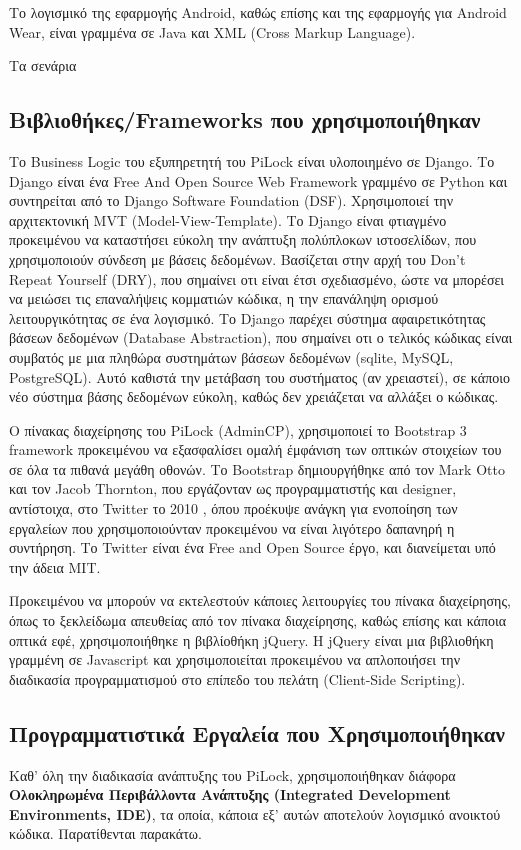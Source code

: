 		Το λογισμικό της εφαρμογής Android, καθώς επίσης και της εφαρμογής για Android Wear, είναι γραμμένα σε Java και XML (Cross Markup Language).

		Τα σενάρια 

	\subsection{Βιβλιοθήκες/Frameworks που χρησιμοποιήθηκαν}
		\label{sub:fws}
		Το Business Logic του εξυπηρετητή του PiLock είναι υλοποιημένο σε Django. Το Django είναι ένα Free And Open Source Web Framework γραμμένο σε Python και συντηρείται από το Django Software Foundation (DSF). Χρησιμοποιεί την αρχιτεκτονική MVT (Model-View-Template). Το Django είναι φτιαγμένο προκειμένου να καταστήσει εύκολη την ανάπτυξη πολύπλοκων ιστοσελίδων, που χρησιμοποιούν σύνδεση με βάσεις δεδομένων. Βασίζεται στην αρχή του Don't Repeat Yourself (DRY), που σημαίνει οτι είναι έτσι σχεδιασμένο, ώστε να μπορέσει να μειώσει τις επαναλήψεις κομματιών κώδικα, η την επανάληψη ορισμού λειτουργικότητας σε ένα λογισμικό. Το Django παρέχει σύστημα αφαιρετικότητας βάσεων δεδομένων (Database Abstraction), που σημαίνει οτι ο τελικός κώδικας είναι συμβατός με μια πληθώρα συστημάτων βάσεων δεδομένων (sqlite, MySQL, PostgreSQL). Αυτό καθιστά την μετάβαση του συστήματος (αν χρειαστεί), σε κάποιο νέο σύστημα βάσης δεδομένων εύκολη, καθώς δεν χρειάζεται να αλλάξει ο κώδικας.

		Ο πίνακας διαχείρησης του PiLock (AdminCP), χρησιμοποιεί το Bootstrap 3 framework προκειμένου να εξασφαλίσει ομαλή έμφάνιση των οπτικών στοιχείων του σε όλα τα πιθανά μεγάθη οθονών. Το Bootstrap δημιουργήθηκε από τον Mark Otto και τον Jacob Thornton, που εργάζονταν ως προγραμματιστής και designer, αντίστοιχα, στο Twitter το 2010 \textsuperscript{\cite{BS_about}}, όπου προέκυψε ανάγκη για ενοποίηση των εργαλείων που χρησιμοποιούνταν προκειμένου να είναι λιγότερο δαπανηρή η συντήρηση. Το Twitter είναι ένα Free and Open Source έργο, και διανείμεται υπό την άδεια MIT.
 		
 		Προκειμένου να μπορούν να εκτελεστούν κάποιες λειτουργίες του πίνακα διαχείρησης, όπως το ξεκλείδωμα απευθείας από τον πίνακα διαχείρησης, καθώς επίσης και κάποια οπτικά εφέ, χρησιμοποιήθηκε η βιβλίοθήκη jQuery. H jQuery είναι μια βιβλιοθήκη γραμμένη σε Javascript και χρησιμοποιείται προκειμένου να απλοποιήσει την διαδικασία προγραμματισμού στο επίπεδο του πελάτη (Client-Side Scripting).

 	\subsection{Προγραμματιστικά Εργαλεία που Χρησιμοποιήθηκαν}
 		Καθ' όλη την διαδικασία ανάπτυξης του PiLock, χρησιμοποιήθηκαν διάφορα \textbf{Ολοκληρωμένα Περιβάλλοντα Ανάπτυξης (Integrated Development Environments, IDE)}, τα οποία, κάποια εξ' αυτών αποτελούν λογισμικό ανοικτού κώδικα. Παρατίθενται παρακάτω.

